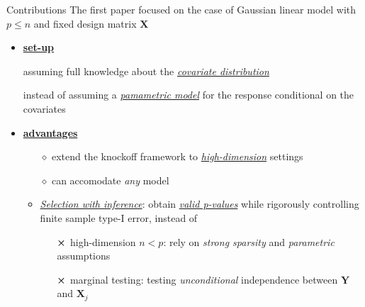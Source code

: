 \begin{frame}{Contributions}
    The first paper focused on the case of Gaussian linear model with $p \leq n$ and fixed design matrix $\mathbf{X}$
    \begin{itemize}
        \item<2-> \underline{\textbf{set-up}}
        
        assuming full knowledge about the \textcolor{glaucous!65!white}{\underline{\textit{covariate distribution}}}
        
        {\footnotesize instead of assuming a \underline{\textit{pamametric model}} for the response conditional on the covariates}
        \vspace*{5pt}
        \item<3-> \underline{\textbf{advantages}}
        \begin{itemize}
            \item[$\diamond$] extend the knockoff framework to \underline{\textit{high-dimension}} settings
            \item[$\diamond$] can accomodate {\textit{any}} model
            \item<4->[$\diamond$] \textcolor{glaucous!65!white}{\textit{\underline{Selection with inference}}}: obtain \underline{\textit{valid p-values}} while rigorously controlling finite sample type-I error, instead of
            \begin{itemize}
                \item[$\cross$] high-dimension $n<p$: rely on \textcolor{glaucous!65!white}{\textit{strong sparsity}} and \textcolor{glaucous!65!white}{\textit{parametric}} assumptions
                \item[$\cross$] marginal testing: testing \textcolor{glaucous!65!white}{\textit{unconditional}} independence between $\mathbf{Y}$ and $\mathbf{X}_j$
            \end{itemize}
        \end{itemize}
    \end{itemize}
\end{frame}
